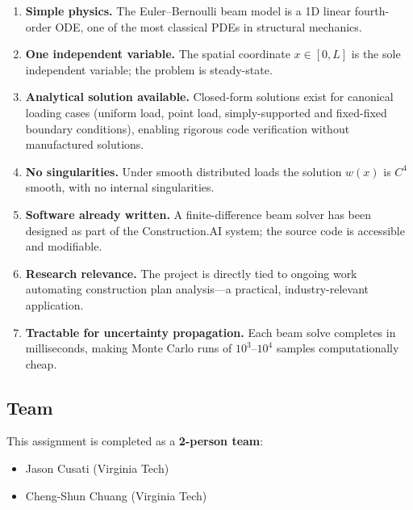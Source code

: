 \begin{enumerate}
  \item \textbf{Simple physics.} The Euler--Bernoulli beam model is a 1D linear fourth-order ODE, one of the most classical PDEs in structural mechanics.
  \item \textbf{One independent variable.} The spatial coordinate $x \in [0, L]$ is the sole independent variable; the problem is steady-state.
  \item \textbf{Analytical solution available.} Closed-form solutions exist for canonical loading cases (uniform load, point load, simply-supported and fixed-fixed boundary conditions), enabling rigorous code verification without manufactured solutions.
  \item \textbf{No singularities.} Under smooth distributed loads the solution $w(x)$ is $C^4$ smooth, with no internal singularities.
  \item \textbf{Software already written.} A finite-difference beam solver has been designed as part of the Construction.AI system; the source code is accessible and modifiable.
  \item \textbf{Research relevance.} The project is directly tied to ongoing work automating construction plan analysis---a practical, industry-relevant application.
  \item \textbf{Tractable for uncertainty propagation.} Each beam solve completes in milliseconds, making Monte Carlo runs of $10^3$--$10^4$ samples computationally cheap.
\end{enumerate}

\subsection{Team}

This assignment is completed as a \textbf{2-person team}:
\begin{itemize}
  \item Jason Cusati (Virginia Tech)
  \item Cheng-Shun Chuang (Virginia Tech)
\end{itemize}